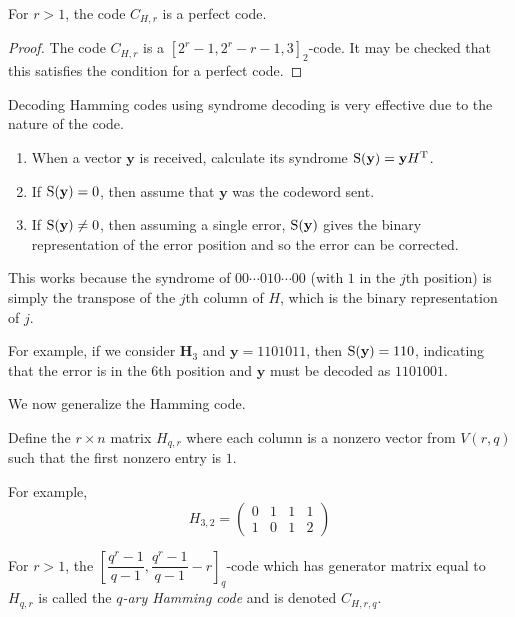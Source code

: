 \begin{theorem}
    For $r>1$, the code $C_{H,r}$ is a perfect code.
\end{theorem}
\begin{proof}
    The code $C_{H,r}$ is a $[2^r-1,2^r-r-1,3]_2$-code. It may be checked that this satisfies the condition for a perfect code.
\end{proof}


Decoding Hamming codes using syndrome decoding is very effective due to the nature of the code.

\begin{enumerate}
    \item When a vector $\textbf{y}$ is received, calculate its syndrome $\operatorname{S}(\textbf{y})=\textbf{y}H^\text{T}$.
    \item If $\operatorname{S}(\textbf{y})=0$, then assume that $\textbf{y}$ was the codeword sent.
    \item If $\operatorname{S}(\textbf{y})\neq 0$, then assuming a single error, $\operatorname{S}(\textbf{y})$ gives the binary representation of the error position and so the error can be corrected.
\end{enumerate}

This works because the syndrome of $00\cdots 010\cdots 00$ (with $1$ in the $j$th position) is simply the transpose of the $j$th column of $H$, which is the binary representation of $j$.

\vspace{2mm}
For example, if we consider $\textbf{H}_3$ and $\textbf{y}=1101011$, then
$\operatorname{S}(\textbf{y})=110$, indicating that the error is in the $6$th position and $\textbf{y}$ must be decoded as $1101001$.

\vspace{2mm}
We now generalize the Hamming code.

\begin{definition}
    Define the $r\times n$ matrix $H_{q,r}$ where each column is a nonzero vector from $V(r,q)$ such that the first nonzero entry is $1$.    
\end{definition}

For example,
$$H_{3,2}=
\begin{pmatrix}
    0 & 1 & 1 & 1 \\
    1 & 0 & 1 & 2
\end{pmatrix}
$$

\begin{definition}
    For $r>1$, the $\left[\dfrac{q^r-1}{q-1}, \dfrac{q^r-1}{q-1}-r\right]_q$-code which has generator matrix equal to $H_{q,r}$ is called the \textit{$q$-ary Hamming code} and is denoted $C_{H,r,q}$.
\end{definition}

